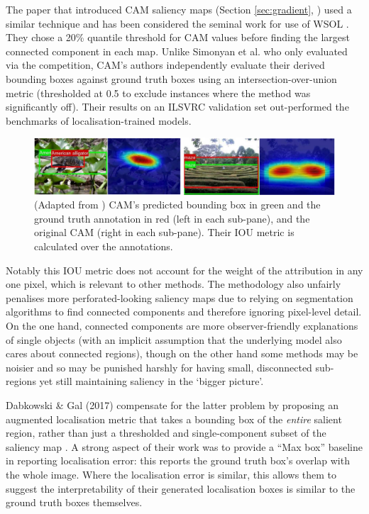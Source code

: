 \documentclass[main]{subfiles}
\begin{document}
The paper that introduced CAM saliency maps (Section \ref{sec:gradient}, \cite{cam}) used a similar technique and has been considered the seminal work for use of WSOL \cite{choe}. They chose a 20\% quantile threshold for CAM values before finding the largest connected component in each map. Unlike Simonyan et al. who only evaluated via the competition, CAM's authors independently evaluate their derived bounding boxes against ground truth boxes using an intersection-over-union metric (thresholded at 0.5 to exclude instances where the method was significantly off). Their results on an ILSVRC validation set out-performed the benchmarks of localisation-trained models.

\begin{figure}[h]
\centering
\includegraphics[scale=0.4]{iou_litreview.png}
\caption{(Adapted from \cite{cam}) CAM's predicted bounding box in green and the ground truth annotation in red  (left in each sub-pane), and the original CAM (right in each sub-pane). Their IOU metric is calculated over the annotations.}
\label{iou_lit_pic}
\end{figure}

Notably this IOU metric does not account for the weight of the attribution in any one pixel, which is relevant to other methods. The methodology also unfairly penalises more perforated-looking saliency maps due to relying on segmentation algorithms to find connected components and therefore ignoring pixel-level detail. On the one hand, connected components are more observer-friendly explanations of single objects (with an implicit assumption that the underlying model also cares about connected regions), though on the other hand some methods may be noisier and so may be punished harshly for having small, disconnected sub-regions yet still maintaining saliency in the `bigger picture'.

Dabkowski \& Gal (2017) compensate for the latter problem by proposing an augmented localisation metric that takes a bounding box of the \textit{entire} salient region, rather than just a thresholded and single-component subset of the saliency map \cite{dabowski}. A strong aspect of their work was to provide a ``Max box'' baseline in reporting localisation error: this reports the ground truth box's overlap with the whole image. Where the localisation error is similar, this allows them to suggest the interpretability of their generated localisation boxes is similar to the ground truth boxes themselves.
\end{document}
